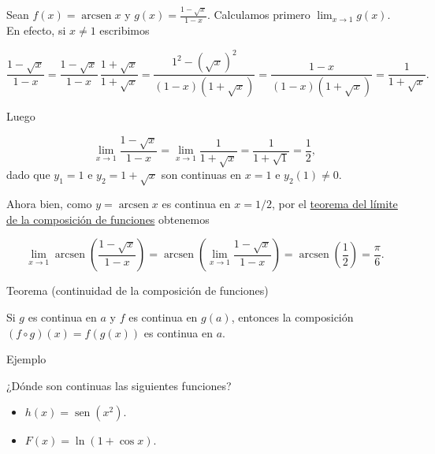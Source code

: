 \documentclass[
  letterpaper,
]{book}
\providecommand{\tightlist}{%
  \setlength{\itemsep}{0pt}\setlength{\parskip}{0pt}}
\theoremstyle{plain}
\theoremstyle{remark}
\begin{document}
\begin{tcolorbox}[enhanced jigsaw, opacityback=0, left=2mm, opacitybacktitle=0.6, toprule=.15mm, bottomrule=.15mm, colbacktitle=quarto-callout-tip-color!10!white, titlerule=0mm, bottomtitle=1mm, title=\textcolor{quarto-callout-tip-color}{\faLightbulb}\hspace{0.5em}{Solución}, toptitle=1mm, colframe=quarto-callout-tip-color-frame, colback=white, breakable, rightrule=.15mm, arc=.35mm, leftrule=.75mm, coltitle=black]

Sean \(f(x)=\operatorname{arcsen} x\) y
\(g(x)=\displaystyle \frac{1-\sqrt{x}}{1-x}\). Calculamos primero
\(\lim_{x\to 1} g(x)\). En efecto, si \(x\neq 1\) escribimos

\[
\frac{1-\sqrt{x}}{1-x}=\frac{1-\sqrt{x}}{1-x}\,\frac{1+\sqrt{x}}{1+\sqrt{x}}=\frac{1^2-(\sqrt{x})^2}{(1-x)(1+\sqrt{x})}=\frac{1-x}{(1-x)(1+\sqrt{x})}=\frac{1}{1+\sqrt{x}}.
\]

Luego

\[
\lim_{x\to 1} \frac{1-\sqrt{x}}{1-x} =\lim_{x\to 1} \frac{1}{1+\sqrt{x}}=\frac{1}{1+\sqrt{1}}=\frac{1}{2},
\] dado que \(y_1=1\) e \(y_2=1+\sqrt{x}\) son continuas en \(x=1\) e
\(y_2(1)\neq 0\).

Ahora bien, como \(y=\operatorname{arcsen} x\) es continua en \(x=1/2\),
por el \hyperref[teo-limite-composicion]{teorema del límite de la
composición de funciones} obtenemos

\[
\lim_{x\to 1} \operatorname{arcsen}\left(\frac{1-\sqrt{x}}{1-x}\right)= \operatorname{arcsen}\left(\lim_{x\to 1} \frac{1-\sqrt{x}}{1-x}\right)=\operatorname{arcsen}\left(\frac{1}{2}\right)=\frac{\pi}{6}.
\]

\end{tcolorbox}

\label{teo-continuidad-composicion}
Teorema (continuidad de la composición de funciones)

Si \(g\) es continua en \(a\) y \(f\) es continua en \(g(a)\), entonces
la composición \((f\circ g)(x)=f(g(x))\) es continua en \(a\).

Ejemplo

¿Dónde son continuas las siguientes funciones?

\begin{itemize}
\tightlist
\item
  \(h(x)=\operatorname{sen}(x^2)\).
\item
  \(F(x)=\ln(1+\cos x)\).
\end{itemize}
\end{document}
